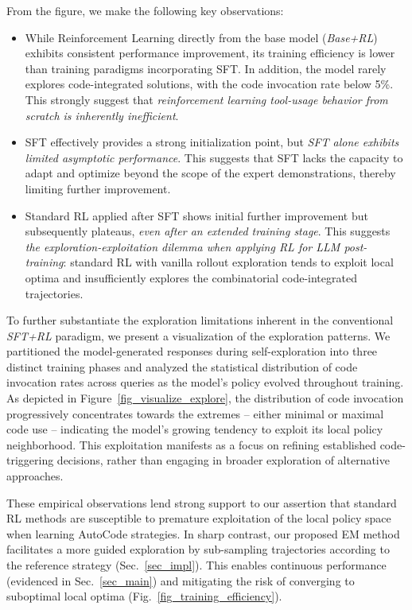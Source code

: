 From the figure, we make the following key observations: 


\begin{itemize}[leftmargin=0.5cm,itemsep=0pt,parsep=0pt]
   \item  While Reinforcement Learning directly from the base model (\emph{Base+RL}) exhibits consistent performance improvement, its training efficiency is lower than training paradigms incorporating SFT.  In addition, the model rarely explores code-integrated solutions, with the code invocation rate below 5\%. This strongly suggest that \emph{reinforcement learning tool-usage behavior from scratch is inherently inefficient}.
    \item SFT effectively provides a strong initialization point, but \emph{SFT alone exhibits limited asymptotic performance}. This suggests that SFT lacks the capacity to adapt and optimize beyond the scope of the expert demonstrations, thereby limiting further improvement. 
    \item Standard RL applied after SFT shows initial further improvement but subsequently plateaus, \emph{even after an extended training stage}.  This suggests \emph{the exploration-exploitation dilemma when applying RL for LLM post-training}: standard RL with vanilla rollout exploration tends to exploit local optima and insufficiently explores the combinatorial code-integrated trajectories.
\end{itemize}

To further substantiate the exploration limitations inherent in the conventional \emph{SFT+RL} paradigm, we present a visualization of the exploration patterns. We partitioned the model-generated responses during self-exploration into three distinct training phases and analyzed the statistical distribution of code invocation rates across queries as the model's policy evolved throughout training. As depicted in Figure~\ref{fig_visualize_explore}, the distribution of code invocation progressively concentrates towards the extremes – either minimal or maximal code use – indicating the model's growing tendency to exploit its local policy neighborhood. This exploitation manifests as a focus on refining established code-triggering decisions, rather than engaging in broader exploration of alternative approaches.



These empirical observations lend strong support to our assertion that standard RL methods are susceptible to premature exploitation of the local policy space when learning AutoCode strategies. In sharp contrast, our proposed EM method facilitates a more guided exploration by sub-sampling trajectories according to the reference strategy (Sec.~\ref{sec_impl}). This enables continuous performance (evidenced in Sec.~\ref{sec_main}) and mitigating the risk of converging to suboptimal local optima (Fig.~\ref{fig_training_efficiency}).


